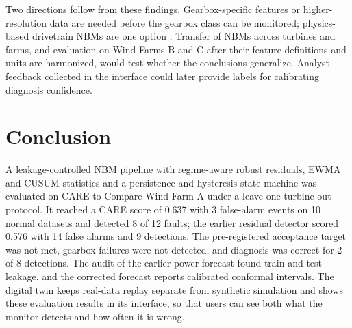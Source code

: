\documentclass[conference]{IEEEtran}
\begin{document}
Two directions follow from these findings. Gearbox-specific features or higher-resolution data are needed before the gearbox class can be monitored; physics-based drivetrain NBMs are one option \cite{lichtenstein2025physics}. Transfer of NBMs across turbines and farms, and evaluation on Wind Farms B and C after their feature definitions and units are harmonized, would test whether the conclusions generalize. Analyst feedback collected in the interface could later provide labels for calibrating diagnosis confidence.

\section{Conclusion}
A leakage-controlled NBM pipeline with regime-aware robust residuals, EWMA and CUSUM statistics and a persistence and hysteresis state machine was evaluated on CARE to Compare Wind Farm A under a leave-one-turbine-out protocol. It reached a CARE score of 0.637 with 3 false-alarm events on 10 normal datasets and detected 8 of 12 faults; the earlier residual detector scored 0.576 with 14 false alarms and 9 detections. The pre-registered acceptance target was not met, gearbox failures were not detected, and diagnosis was correct for 2 of 8 detections. The audit of the earlier power forecast found train and test leakage, and the corrected forecast reports calibrated conformal intervals. The digital twin keeps real-data replay separate from synthetic simulation and shows these evaluation results in its interface, so that users can see both what the monitor detects and how often it is wrong.



\end{document}
